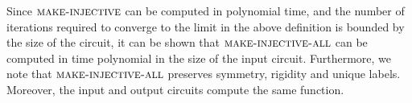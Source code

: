 \documentclass[../paper.tex]{subfiles}
\begin{document}
Since ${\normalfont\textsc{make-injective}}$ can be computed in polynomial time, and the number
of iterations required to converge to the limit in the above definition is
bounded by the size of the circuit, it can be shown that
${\normalfont\textsc{make-injective-all}}$ can be computed in time polynomial in the size of the
input circuit. Furthermore, we note that ${\normalfont\textsc{make-injective-all}}$ preserves
symmetry, rigidity and unique labels. Moreover, the input and output circuits
compute the same function.


  





\end{document}
